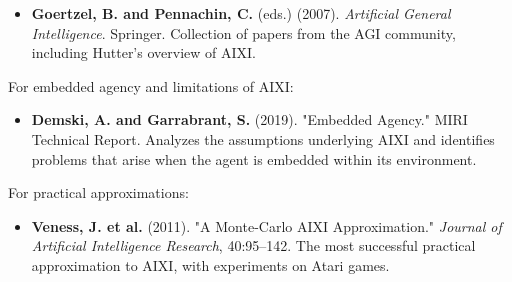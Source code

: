 \begin{itemize}
\item \textbf{Goertzel, B. and Pennachin, C.} (eds.) (2007). \textit{Artificial General Intelligence}. Springer. Collection of papers from the AGI community, including Hutter's overview of AIXI.
\end{itemize}

For embedded agency and limitations of AIXI:

\begin{itemize}
\item \textbf{Demski, A. and Garrabrant, S.} (2019). "Embedded Agency." MIRI Technical Report. Analyzes the assumptions underlying AIXI and identifies problems that arise when the agent is embedded within its environment.
\end{itemize}

For practical approximations:

\begin{itemize}
\item \textbf{Veness, J. et al.} (2011). "A Monte-Carlo AIXI Approximation." \textit{Journal of Artificial Intelligence Research}, 40:95--142. The most successful practical approximation to AIXI, with experiments on Atari games.
\end{itemize}
